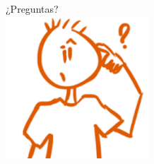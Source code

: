 \documentclass{beamer}
\begin{document}
\begin{frame}
  \begin{center}
    \huge{¿Preguntas?}\\
    \vspace{5mm}
    \includegraphics[height=0.4\textheight,width=0.4\textwidth]{logos/preguntas}
  \end{center}
\end{frame}
\end{document}
